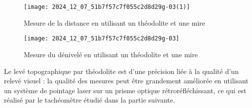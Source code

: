 \begin{figure}[!h]
\centering
\texttt{[image: 2024\_12\_07\_51b7f57c7f055c2d8d29g-03(1)]}
\caption{Mesure de la distance en utilisant un théodolite et une mire \label{CCS_MP_2017:fig_03}}
\end{figure}

\begin{figure}[!h]
\centering
\texttt{[image: 2024\_12\_07\_51b7f57c7f055c2d8d29g-03]}
\caption{Mesure du dénivelé en utilisant un théodolite et une mire \label{CCS_MP_2017:fig_04}}
\end{figure}

\ifprof
\begin{corrige}
\end{corrige}
\else
\fi

Le levé topographique par théodolite est d'une précision liée à la qualité d'un relevé visuel : la qualité des mesures peut être grandement améliorée en utilisant un système de pointage laser sur un prisme optique rétroréfléchissant, ce qui est réalisé par le tachéomètre étudié dans la partie suivante.



